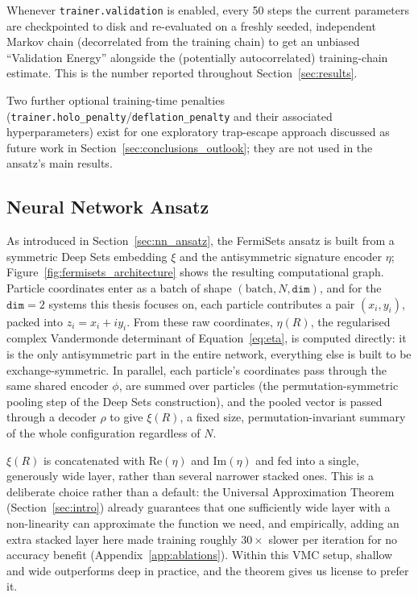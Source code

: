 \documentclass[a4paper,11pt,twoside]{article}
\begin{document}
Whenever \texttt{trainer.validation} is enabled, every 50 steps the current parameters are checkpointed to disk and re-evaluated on a freshly seeded, independent Markov chain (decorrelated from the training chain) to get an unbiased ``Validation Energy'' alongside the (potentially autocorrelated) training-chain estimate. This is the number reported throughout Section~\ref{sec:results}.

Two further optional training-time penalties (\texttt{trainer.holo\_penalty}/\texttt{deflation\_penalty} and their associated hyperparameters) exist for one exploratory trap-escape approach discussed as future work in Section~\ref{sec:conclusions_outlook}; they are not used in the ansatz's main results.


\subsection{Neural Network Ansatz}

As introduced in Section~\ref{sec:nn_ansatz}, the FermiSets ansatz is built from a symmetric Deep Sets embedding $\xi$ and the antisymmetric signature encoder $\eta$; Figure~\ref{fig:fermisets_architecture} shows the resulting computational graph. Particle coordinates enter as a batch of shape $(\text{batch}, N, \texttt{dim})$, and for the $\texttt{dim}=2$ systems this thesis focuses on, each particle contributes a pair $(x_i,y_i)$, packed into $z_i = x_i + iy_i$. From these raw coordinates, $\eta(R)$, the regularised complex Vandermonde determinant of Equation~\ref{eq:eta}, is computed directly: it is the only antisymmetric part in the entire network, everything else is built to be exchange-symmetric. In parallel, each particle's coordinates pass through the same shared encoder $\phi$, are summed over particles (the permutation-symmetric pooling step of the Deep Sets construction), and the pooled vector is passed through a decoder $\rho$ to give $\xi(R)$, a fixed size, permutation-invariant summary of the whole configuration regardless of $N$.

$\xi(R)$ is concatenated with $\mathrm{Re}(\eta)$ and $\mathrm{Im}(\eta)$ and fed into a single, generously wide layer, rather than several narrower stacked ones. This is a deliberate choice rather than a default: the Universal Approximation Theorem (Section~\ref{sec:intro}) already guarantees that one sufficiently wide layer with a non-linearity can approximate the function we need, and empirically, adding an extra stacked layer here made training roughly $30\times$ slower per iteration for no accuracy benefit (Appendix~\ref{app:ablations}). Within this VMC setup, shallow and wide outperforms deep in practice, and the theorem gives us license to prefer it.
\end{document}
